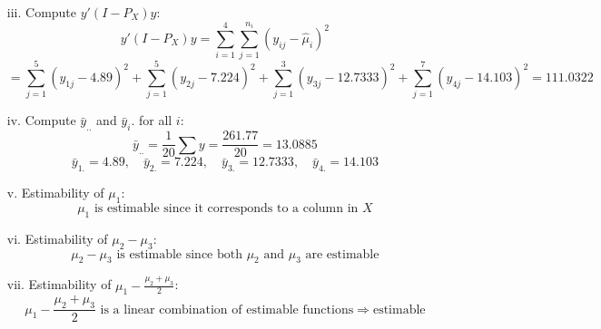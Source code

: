 \documentclass[10pt, oneside]{article}
\begin{document}
\begin{itemize}
\begin{itemize}
		\item[iii.] Compute $y'(I - P_X)y$:
        \[
    y'(I - P_X)y = \sum_{i=1}^{4} \sum_{j=1}^{n_i} (y_{ij} - \hat{\mu}_i)^2
  \]
  \[
    = \sum_{j=1}^{5} (y_{1j} - 4.89)^2 + \sum_{j=1}^{5} (y_{2j} - 7.224)^2 + \sum_{j=1}^{3} (y_{3j} - 12.7333)^2 + \sum_{j=1}^{7} (y_{4j} - 14.103)^2 = 111.0322
  \]
		\item[iv.] Compute $\bar{y}_{..}$ and $\bar{y}_i.$ for all $i$:
        \[
    \bar{y}_{..} = \frac{1}{20} \sum y = \frac{261.77}{20} = 13.0885
  \]
  \[
    \bar{y}_{1.} = 4.89, \quad \bar{y}_{2.} = 7.224, \quad \bar{y}_{3.} = 12.7333, \quad \bar{y}_{4.} = 14.103
  \]
		\item[v.] Estimability of $\mu_1$:
        \[
    \mu_1 \text{ is estimable since it corresponds to a column in } X
  \]
		\item[vi.] Estimability of $\mu_2 - \mu_3$:
        \[
    \mu_2 - \mu_3 \text{ is estimable since both } \mu_2 \text{ and } \mu_3 \text{ are estimable}
  \]
		\item[vii.] Estimability of $\mu_1 - \frac{\mu_2 + \mu_3}{2}$:
        \[
    \mu_1 - \frac{\mu_2 + \mu_3}{2} \text{ is a linear combination of estimable functions} \Rightarrow \text{estimable}
  \]
	\end{itemize}
\end{itemize}
\end{document}
